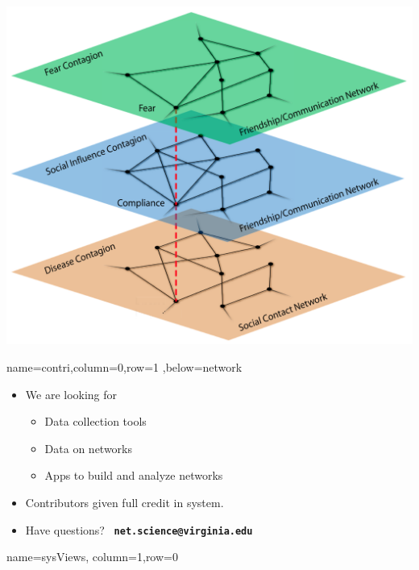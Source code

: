 \documentclass[landscape,paperwidth=70in,paperheight=46in,fontscale=0.225]{baposter} %
\begin{document}
\begin{poster}
{\begin{minipage}{.35\textwidth}
 \centering
\includegraphics[scale=0.35]{figures/multi_net.png}
\end{minipage}
}
          {name=contri,column=0,row=1 ,below=network}{
\begin{itemize}[leftmargin=*,noitemsep,topsep=0pt]
\item We are looking for
\begin{itemize}
\item Data collection tools
\item Data on networks
\item Apps to build and analyze networks
\end{itemize}
\item Contributors given full credit in system.
\medskip
\item Have questions?~ \textbf{\texttt{net.science@virginia.edu}}
\end{itemize}

}


          {name=sysViews, column=1,row=0}{

}
\end{poster}
\end{document}
